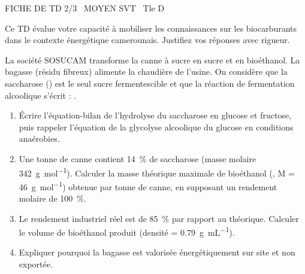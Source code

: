 \documentclass[11pt]{article}
\begin{document}
\begin{tcolorbox}[enhanced,colback=popink,colframe=popink,arc=10pt,boxrule=0pt,left=12pt,right=12pt,top=9pt,bottom=9pt]
{\color{white}\popxbold\small FICHE DE TD 2/3 \textbullet\ MOYEN \hfill SVT \textbullet\ Tle D\par}
\end{tcolorbox}
\vspace{4pt}
Ce TD évalue votre capacité à mobiliser les connaissances sur les biocarburants dans le contexte énergétique camerounais. Justifiez vos réponses avec rigueur.

\begin{exercice}
La société SOSUCAM transforme la canne à sucre en sucre et en bioéthanol. La bagasse (résidu fibreux) alimente la chaudière de l'usine. On considère que la saccharose () est le seul sucre fermentescible et que la réaction de fermentation alcoolique s'écrit : 
.
\begin{enumerate}
    \item Écrire l'équation-bilan de l'hydrolyse du saccharose en glucose et fructose, puis rappeler l'équation de la glycolyse alcoolique du glucose en conditions anaérobies.
    \item Une tonne de canne contient \SI{14}{\%} de saccharose (masse molaire \SI{342}{g.mol^{-1}}). Calculer la masse théorique maximale de bioéthanol (, M = \SI{46}{g.mol^{-1}}) obtenue par tonne de canne, en supposant un rendement molaire de \SI{100}{\%}.
    \item Le rendement industriel réel est de \SI{85}{\%} par rapport au théorique. Calculer le volume de bioéthanol produit (densité \rho = \SI{0,79}{g.mL^{-1}}). 
    \item Expliquer pourquoi la bagasse est valorisée énergétiquement sur site et non exportée.
\end{enumerate}
\end{exercice}
\end{document}
